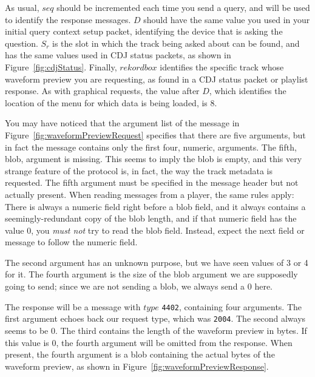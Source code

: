 \documentclass[11pt]{article}
\begin{document}
As usual, $seq$ should be incremented each time you send a query, and
will be used to identify the response messages. $D$ should have the
same value you used in your initial query context setup packet,
identifying the device that is asking the question. $S_r$ is the slot
in which the track being asked about can be found, and has the same
values used in CDJ status packets, as shown in
Figure~\ref{fig:cdjStatus}. Finally, $rekordbox$ identifies the
specific track whose waveform preview you are requesting, as found in
a CDJ status packet or playlist response. As with graphical requests,
the value after $D$, which identifies the location of the menu for
which data is being loaded, is 8.

You may have noticed that the argument list of the message in
Figure~\ref{fig:waveformPreviewRequest} specifies that there are five
arguments, but in fact the message contains only the first four,
numeric, arguments. The fifth, blob, argument is missing. This seems
to imply the blob is empty, and this very strange feature of the
protocol is, in fact, the way the track metadata is requested. The
fifth argument must be specified in the message header but not
actually present. When reading messages from a player, the same rules
apply: There is always a numeric field right before a blob field, and
it always contains a seemingly-redundant copy of the blob length, and
if that numeric field has the value $0$, you \emph{must not} try to
read the blob field. Instead, expect the next field or message to
follow the numeric field.

The second argument has an unknown purpose, but we have seen values of
3 or 4 for it. The fourth argument is the size of the blob argument we
are supposedly going to send; since we are not sending a blob, we
always send a 0 here.

The response will be a message with $type$ {\tt 4402}, containing
four arguments. The first argument echoes back our request type, which
was {\tt 2004}. The second always seems to be 0. The third contains
the length of the waveform preview in bytes. If this value is 0, the
fourth argument will be omitted from the response. When present, the
fourth argument is a blob containing the actual bytes of the waveform
preview, as shown in Figure~\ref{fig:waveformPreviewResponse}.
\end{document}
